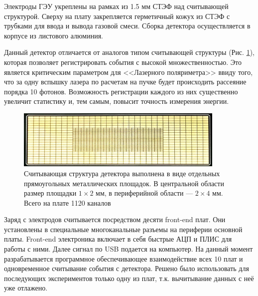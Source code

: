 \par Электроды ГЭУ укреплены на рамках из 1.5 мм СТЭФ над считывающей структурой. Сверху на плату закрепляется герметичный кожух из СТЭФ с трубками для ввода и вывода газовой смеси. Сборка детектора осуществляется в корпусе из листового алюминия.
\par Данный детектор отличается от аналогов типом считывающей структуры (Рис. \ref{fig:readout_structure}), которая позволяет регистрировать события с высокой множественностью. Это является критическим параметром для <<Лазерного поляриметра>> ввиду того, что за одну вспышку лазера по расчетам на пучке будет происходить рассеяние порядка 10 фотонов. Возможность регистрации каждого из них существенно увеличит статистику и, тем самым, повысит точность измерения энергии.
\begin{figure}[H]
	\begin{center}
		\includegraphics[width = 10cm]{img/Main_board_pads.jpg}
		\caption{Считывающая структура детектора выполнена в виде отдельных прямоугольных металлических площадок. В центральной области размер площадки $1\times2$ мм, в периферийной области --- $2\times4$ мм. Всего на плате 1120 каналов}
		\label{fig:readout_structure}
	\end{center}%
\end{figure}%
\noindent Заряд с электродов считывается  посредством десяти front-end плат. Они установлены в специальные многоканальные разъемы на периферии основной платы. Front-end электроника включает в себя быстрые АЦП и ПЛИС для работы с ними. Далее сигнал по USB подается на компьютер. На данный момент разрабатывается программное обеспечивающее взаимодействие всех 10 плат и одновременное считывание события с детектора. Решено было использовать для последующих экспериментов только одну из плат, т.к. вычитывание данных с неё уже отлажено. 
